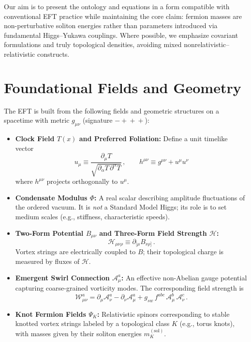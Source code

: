 \documentclass[12pt]{article}
\begin{document}
    Our aim is to present the ontology and equations in a form compatible with conventional EFT practice while maintaining the core claim: fermion masses are non-perturbative soliton energies rather than parameters introduced via fundamental Higgs--Yukawa couplings. Where possible, we emphasize covariant formulations and truly topological densities, avoiding mixed nonrelativistic--relativistic constructs.

    \section{Foundational Fields and Geometry}

    The EFT is built from the following fields and geometric structures on a spacetime with metric $g_{\mu\nu}$ (signature $-\!+\!+\!+$):
    \begin{itemize}
        \item \textbf{Clock Field $T(x)$ and Preferred Foliation:} Define a unit timelike vector
        \begin{equation}
            u_\mu \equiv \frac{\partial_\mu T}{\sqrt{\partial_\alpha T\,\partial^\alpha T}}\,,\qquad
            h^{\mu\nu} \equiv g^{\mu\nu} + u^{\mu}u^{\nu}
        \end{equation}
        where $h^{\mu\nu}$ projects orthogonally to $u^\mu$.

        \item \textbf{Condensate Modulus $\Phi$:} A real scalar describing amplitude fluctuations of the ordered vacuum. It is \emph{not} a Standard Model Higgs; its role is to set medium scales (e.g., stiffness, characteristic speeds).

        \item \textbf{Two-Form Potential $B_{\mu\nu}$ and Three-Form Field Strength $\mathcal{H}$:}
        \begin{equation}
            \mathcal{H}_{\mu\nu\rho} \equiv \partial_{[\mu} B_{\nu\rho]}\,.
        \end{equation}
        Vortex strings are electrically coupled to $B$; their topological charge is measured by fluxes of $\mathcal{H}$.

        \item \textbf{Emergent Swirl Connection $\mathcal{A}_\mu^a$:} An effective non-Abelian gauge potential capturing coarse-grained vorticity modes. The corresponding field strength is
        \begin{equation}
            \mathcal{W}_{\mu\nu}^a = \partial_\mu \mathcal{A}_\nu^a - \partial_\nu \mathcal{A}_\mu^a + g_{\!sw}\, f^{abc}\,\mathcal{A}_\mu^b\,\mathcal{A}_\nu^c\,.
        \end{equation}

        \item \textbf{Knot Fermion Fields $\Psi_K$:} Relativistic spinors corresponding to stable knotted vortex strings labeled by a topological class $K$ (e.g., torus knots), with masses given by their soliton energies $m_K^{(\mathrm{sol})}$.
    \end{itemize}
\end{document}
